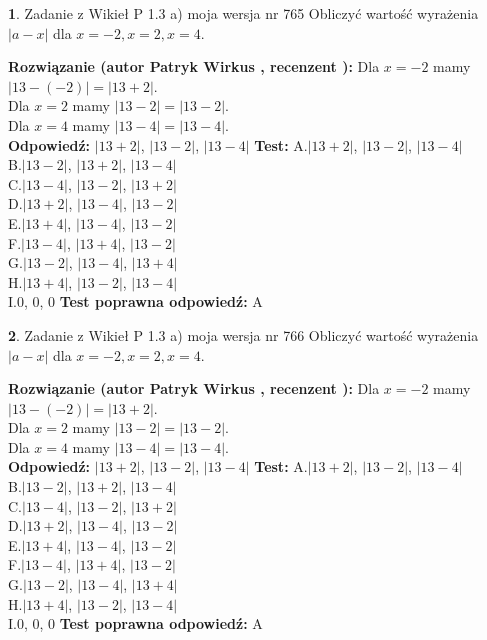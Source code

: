 \documentclass[12pt, a4paper]{article}
\theoremstyle{definition} %
\newtheorem{zad}{}
\newcommand{\zadStart}[1]{\begin{zad}#1\newline}
\newcommand{\zadStop}{\end{zad}}
\newcommand{\rozwStart}[2]{\noindent \textbf{Rozwiązanie (autor #1 , recenzent #2): }\newline}
\newcommand{\rozwStop}{\newline}
\newcommand{\odpStart}{\noindent \textbf{Odpowiedź:}\newline}
\newcommand{\odpStop}{\newline}
\newcommand{\testStart}{\noindent \textbf{Test:}\newline}
\newcommand{\testStop}{\newline}
\newcommand{\kluczStart}{\noindent \textbf{Test poprawna odpowiedź:}\newline}
\newcommand{\kluczStop}{\newline}
\begin{document}
\zadStart{Zadanie z Wikieł P 1.3 a) moja wersja nr 765}
Obliczyć wartość wyrażenia $|a - x|$ dla $x=-2,x=2,x=4$.
\zadStop
\rozwStart{Patryk Wirkus}{}
Dla $x = -2$ mamy $|13 - (-2)| = |13 + 2|$.\\
Dla $x = 2$ mamy $|13 - 2| = |13 - 2|$.\\
Dla $x = 4$ mamy $|13 - 4| = |13 - 4|$.\\
\rozwStop
\odpStart
$|13 + 2|$, $|13 - 2|$, $|13 - 4|$
\odpStop
\testStart
A.$|13 + 2|$, $|13 - 2|$, $|13 - 4|$\\
B.$|13 - 2|$, $|13 + 2|$, $|13 - 4|$\\
C.$|13 - 4|$, $|13 - 2|$, $|13 + 2|$\\
D.$|13 + 2|$, $|13 - 4|$, $|13 - 2|$\\
E.$|13 + 4|$, $|13 - 4|$, $|13 - 2|$\\
F.$|13 - 4|$, $|13 + 4|$, $|13 - 2|$\\
G.$|13 - 2|$, $|13 - 4|$, $|13 + 4|$\\
H.$|13 + 4|$, $|13 - 2|$, $|13 - 4|$\\
I.$0$, $0$, $0$
\testStop
\kluczStart
A
\kluczStop



\zadStart{Zadanie z Wikieł P 1.3 a) moja wersja nr 766}
Obliczyć wartość wyrażenia $|a - x|$ dla $x=-2,x=2,x=4$.
\zadStop
\rozwStart{Patryk Wirkus}{}
Dla $x = -2$ mamy $|13 - (-2)| = |13 + 2|$.\\
Dla $x = 2$ mamy $|13 - 2| = |13 - 2|$.\\
Dla $x = 4$ mamy $|13 - 4| = |13 - 4|$.\\
\rozwStop
\odpStart
$|13 + 2|$, $|13 - 2|$, $|13 - 4|$
\odpStop
\testStart
A.$|13 + 2|$, $|13 - 2|$, $|13 - 4|$\\
B.$|13 - 2|$, $|13 + 2|$, $|13 - 4|$\\
C.$|13 - 4|$, $|13 - 2|$, $|13 + 2|$\\
D.$|13 + 2|$, $|13 - 4|$, $|13 - 2|$\\
E.$|13 + 4|$, $|13 - 4|$, $|13 - 2|$\\
F.$|13 - 4|$, $|13 + 4|$, $|13 - 2|$\\
G.$|13 - 2|$, $|13 - 4|$, $|13 + 4|$\\
H.$|13 + 4|$, $|13 - 2|$, $|13 - 4|$\\
I.$0$, $0$, $0$
\testStop
\kluczStart
A
\kluczStop
\end{document}
